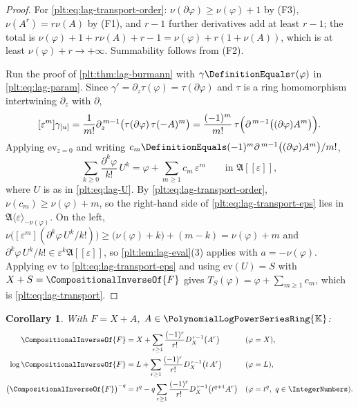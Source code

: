\documentclass[11pt,oneside]{article}
\theoremstyle{plain}
\newtheorem{corollary}[theorem]{Corollary}
\theoremstyle{definition}
\theoremstyle{remark}
\newcommand{\K}{\mathbb{K}}
\newcommand{\PLpow}{\PolynomialLogPowerSeriesRing{\K}}   %
\newcommand{\DX}{D_{X}}                                  %
\newcommand{\rev}[1]{\CompositionalInverseOf{#1}}
\begin{document}
\begin{proof}
For \cref{plt:eq:lag-transport-order}: \(\nu(\partial\varphi)\ge\nu(\varphi)+1\)
by (F3), \(\nu(A^r)=r\nu(A)\) by (F1), and \(r-1\) further derivatives add at
least \(r-1\); the total is
\(\nu(\varphi)+1+r\nu(A)+r-1=\nu(\varphi)+r(1+\nu(A))\), which is at least
\(\nu(\varphi)+r\to+\infty\).  Summability follows from (F2).

Run the proof of \cref{plt:thm:lag-burmann} with \(\gamma\DefinitionEquals
\tau(\varphi)\) in \cref{plt:eq:lag-param}.  Since
\(\gamma'=\partial_z\tau(\varphi)=\tau(\partial\varphi)\) and \(\tau\) is a ring
homomorphism intertwining \(\partial_z\) with \(\partial\),
\[
  [\varepsilon^m]\gamma_{[u]}
  =\frac1{m!}\partial_z^{\,m-1}\bigl(\tau(\partial\varphi)\,\tau(-A)^m\bigr)
  =\frac{(-1)^m}{m!}\,
    \tau\Bigl(\partial^{\,m-1}\bigl((\partial\varphi)A^m\bigr)\Bigr).
\]
Applying \(\mathrm{ev}_{z=0}\) and writing
\(c_m\DefinitionEquals(-1)^m\partial^{\,m-1}\bigl((\partial\varphi)A^m\bigr)/m!\),
\begin{equation}
\label{plt:eq:lag-transport-eps}
  \sum_{k\ge0}\frac{\partial^k\varphi}{k!}\,U^k
  =\varphi+\sum_{m\ge1}c_m\,\varepsilon^m
  \qquad\text{in }\mathfrak A[[\varepsilon]],
\end{equation}
where \(U\) is as in \cref{plt:eq:lag-U}.  By
\cref{plt:eq:lag-transport-order}, \(\nu(c_m)\ge\nu(\varphi)+m\), so the
right-hand side of \cref{plt:eq:lag-transport-eps} lies in
\(\mathfrak A\langle\varepsilon\rangle_{-\nu(\varphi)}\).  On the left,
\(\nu\bigl([\varepsilon^m](\partial^k\varphi\,U^k/k!)\bigr)
\ge\bigl(\nu(\varphi)+k\bigr)+(m-k)=\nu(\varphi)+m\) and
\(\partial^k\varphi\,U^k/k!\in\varepsilon^k\mathfrak A[[\varepsilon]]\), so
\cref{plt:lem:lag-eval}(3) applies with \(a=-\nu(\varphi)\).  Applying
\(\mathrm{ev}\) to \cref{plt:eq:lag-transport-eps} and using
\(\mathrm{ev}(U)=S\) with \(X+S=\rev{F}\) gives
\(T_S(\varphi)=\varphi+\sum_{m\ge1}c_m\), which is
\cref{plt:eq:lag-transport}.
\end{proof}

\begin{corollary}
\label{plt:cor:lag-observables}
With \(F=X+A\), \(A\in\PLpow\):
\begin{align}
  \rev{F}&=X+\sum_{r\ge1}\frac{(-1)^r}{r!}\DX^{\,r-1}\bigl(A^r\bigr)
  &&(\varphi=X),\label{plt:eq:lag-obs-X}\\
  \log\rev{F}&=L+\sum_{r\ge1}\frac{(-1)^r}{r!}\DX^{\,r-1}\bigl(t\,A^r\bigr)
  &&(\varphi=L),\label{plt:eq:lag-obs-L}\\
  \bigl(\rev{F}\bigr)^{-q}&=t^q-q\sum_{r\ge1}\frac{(-1)^r}{r!}
      \DX^{\,r-1}\bigl(t^{q+1}A^r\bigr)
  &&(\varphi=t^q,\ q\in\IntegerNumbers).\label{plt:eq:lag-obs-power}
\end{align}
\end{corollary}
\end{document}
